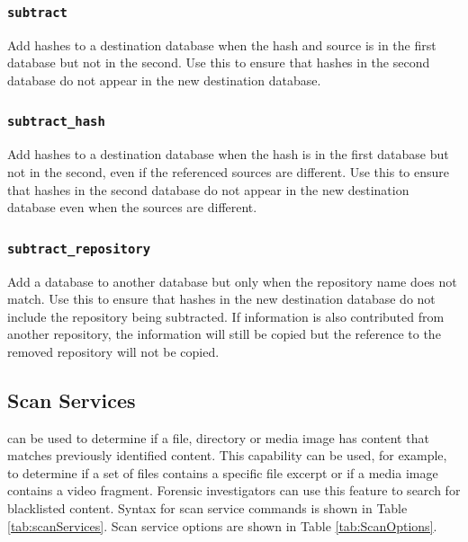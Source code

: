 \documentclass[11pt,fleqn]{article} %
\begin{document}
\subsubsection{\texttt{subtract}}
Add hashes to a destination database when the hash and source is in the first database but not in the second. Use this to ensure that hashes in the second database do not appear in the new destination database.
\subsubsection{\texttt{subtract\_hash}}
Add hashes to a destination database when the hash is in the first database but not in the second, even if the referenced sources are different. Use this to ensure that hashes in the second database do not appear in the new destination database even when the sources are different.
\subsubsection{\texttt{subtract\_repository}}
Add a database to another database but only when the repository name does not match. Use this to ensure that hashes in the new destination database do not include the repository being subtracted. If information is also contributed from another repository, the information will still be copied but the reference to the removed repository will not be copied.

\subsection{Scan Services}
\label{ScanServices}
\hdb can be used to determine if a file, directory or media image has content that matches previously identified content. This capability can be used, for example, to determine if a set of files contains a specific file excerpt or if a media image contains a video fragment. Forensic investigators can use this feature to search for blacklisted content.
Syntax for scan service commands is shown in Table \ref{tab:scanServices}. Scan service options are shown in Table \ref{tab:ScanOptions}.\\
\end{document}
